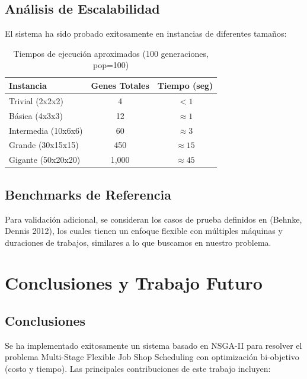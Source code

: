 \documentclass[preprint,12pt,authoryear]{elsarticle}
\begin{document}
\subsection{Análisis de Escalabilidad}

El sistema ha sido probado exitosamente en instancias de diferentes tamaños:

\begin{table}[h]
\centering
\caption{Tiempos de ejecución aproximados (100 generaciones, pop=100)}
\begin{tabular}{|l|c|c|}
\hline
\textbf{Instancia} & \textbf{Genes Totales} & \textbf{Tiempo (seg)} \\
\hline
Trivial (2x2x2) & 4 & $<1$ \\
Básica (4x3x3) & 12 & $\approx 1$ \\
Intermedia (10x6x6) & 60 & $\approx 3$ \\
Grande (30x15x15) & 450 & $\approx 15$ \\
Gigante (50x20x20) & 1,000 & $\approx 45$ \\
\hline
\end{tabular}
\end{table}

\subsection{Benchmarks de Referencia}

Para validación adicional, se consideran los casos de prueba definidos en \cite{behnke2012} (Behnke, Dennis 2012), los cuales tienen un enfoque flexible con múltiples máquinas y duraciones de trabajos, similares a lo que buscamos en nuestro problema.


\section{Conclusiones y Trabajo Futuro}

\subsection{Conclusiones}

Se ha implementado exitosamente un sistema basado en NSGA-II para resolver el problema Multi-Stage Flexible Job Shop Scheduling con optimización bi-objetivo (costo y tiempo). Las principales contribuciones de este trabajo incluyen:
\end{document}
